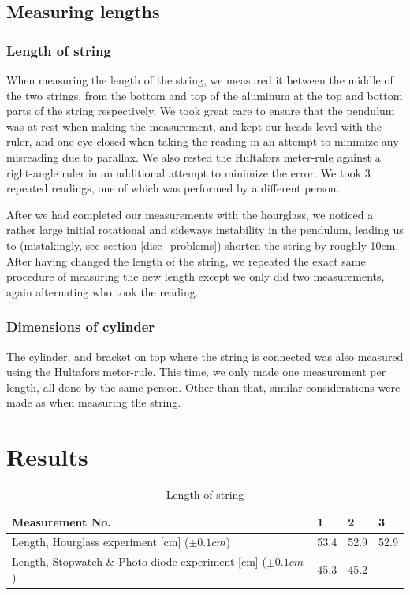 \documentclass[%
 reprint,
 amsmath,amssymb,
 aps,
]{revtex4-1}
\begin{document}
        \subsection{Measuring lengths}
            \subsubsection{\label{subsubsect:strings}Length of string}
                When measuring the length of the string, we measured it between the middle of the two strings, from the bottom and top of the aluminum at the top and bottom parts of the string respectively. We took great care to ensure that the pendulum was at rest when making the measurement, and kept our heads level with the ruler, and one eye closed when taking the reading in an attempt to minimize any misreading due to parallax. We also rested the Hultafors meter-rule against a right-angle ruler in an additional attempt to minimize the error. We took 3 repeated readings, one of which was performed by a different person. 

                After we had completed our measurements with the hourglass, we noticed a rather large initial rotational and sideways instability in the pendulum, leading us to (mistakingly, see section \ref{disc_problems}) shorten the string by roughly 10cm. After having changed the length of the string, we repeated the exact same procedure of measuring the new length except we only did two measurements, again alternating who took the reading.

            \subsubsection{\label{subsubsect:dim_cyllinder}Dimensions of cylinder}
                The cylinder, and bracket on top where the string is connected was also measured using the Hultafors meter-rule. This time, we only made one measurement per length, all done by the same person. Other than that, similar considerations were made as when measuring the string.





\section{\label{sect:results}Results}
    
        \begin{table}[h] %
        \center
        \caption{Length of string}
        \label{tab:stopwatch}
        \begin{tabular}{| p{5cm} | l | l | l |}
            \hline
            Measurement No. & 1 & 2 & 3 \\ \hline 
            Length, Hourglass experiment [cm] ($\pm 0.1cm$) 
            & 53.4 & 52.9 & 52.9\\ \hline
            Length, Stopwatch \& Photo-diode experiment [cm] ($\pm 0.1cm$) 
            & 45.3 & 45.2 &  \\ \hline
        \end{tabular}
    \end{table}
\end{document}
